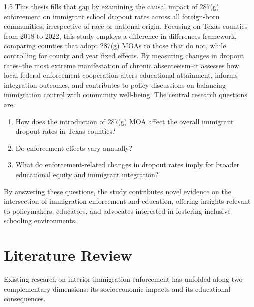 \documentclass[12pt]{article}
\begin{document}
\begin{spacing}{1.5}
This thesis fills that gap by examining the causal impact of 287(g) enforcement on immigrant school dropout rates across all foreign‑born communities, irrespective of race or national origin. Focusing on Texas counties from 2018 to 2022, this study employs a difference‑in‑differences framework, comparing counties that adopt 287(g) MOAs to those that do not, while controlling for county and year fixed effects. By measuring changes in dropout rates–the most extreme manifestation of chronic absenteeism–it assesses how local‑federal enforcement cooperation alters educational attainment, informs integration outcomes, and contributes to policy discussions on balancing immigration control with community well‑being.
The central research questions are:
\begin{enumerate}
    \item How does the introduction of 287(g) MOA affect the overall immigrant dropout rates in Texas counties?
    \item Do enforcement effects vary annually?
    \item What do enforcement-related changes in dropout rates imply for broader educational equity and immigrant integration?
\end{enumerate}
By answering these questions, the study contributes novel evidence on the intersection of immigration enforcement and education, offering insights relevant to policymakers, educators, and advocates interested in fostering inclusive schooling environments.

\section{Literature Review}
Existing research on interior immigration enforcement has unfolded along two complementary dimensions: its socioeconomic impacts and its educational consequences.


\end{spacing}
\end{document}
